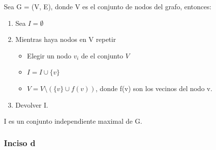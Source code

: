 \begin{theorem}
	Sea G = (V, E), donde V es el conjunto de nodos del grafo, entonces:
	\begin{enumerate}
		\item Sea $I = \emptyset$
		\item Mientras haya nodos en V repetir
		\begin{itemize}
			\item Elegir un nodo $v_i$ de el conjunto $V$
			\item $I = I \cup \{v\} $
			\item $V = V \setminus (\{v\} \cup f(v)) $, donde f(v) son los vecinos del nodo v.
		\end{itemize}
		\item Devolver I.
	\end{enumerate}
	I es un conjunto independiente maximal de G.
\end{theorem}

\subsubsection{Inciso d}

